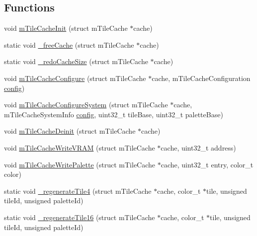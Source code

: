 \subsection*{Functions}
\begin{DoxyCompactItemize}
\item 
void \mbox{\hyperlink{tile-cache_8c_ae11c387e6cfd9f19218653824ee13308}{m\+Tile\+Cache\+Init}} (struct m\+Tile\+Cache $\ast$cache)
\item 
static void \mbox{\hyperlink{tile-cache_8c_a4f35746d84b7aef07507094ca898748f}{\+\_\+free\+Cache}} (struct m\+Tile\+Cache $\ast$cache)
\item 
static void \mbox{\hyperlink{tile-cache_8c_a153de28ed2867a57b6de1dff09c616b2}{\+\_\+redo\+Cache\+Size}} (struct m\+Tile\+Cache $\ast$cache)
\item 
void \mbox{\hyperlink{tile-cache_8c_aac84a3d9543f7c4b29734b064d88bc53}{m\+Tile\+Cache\+Configure}} (struct m\+Tile\+Cache $\ast$cache, m\+Tile\+Cache\+Configuration \mbox{\hyperlink{deflate_8c_a4473b5227787415097004fd39f55185e}{config}})
\item 
void \mbox{\hyperlink{tile-cache_8c_a17c8e2e1e7c0b387bcf886e51b3c1fa1}{m\+Tile\+Cache\+Configure\+System}} (struct m\+Tile\+Cache $\ast$cache, m\+Tile\+Cache\+System\+Info \mbox{\hyperlink{deflate_8c_a4473b5227787415097004fd39f55185e}{config}}, uint32\+\_\+t tile\+Base, uint32\+\_\+t palette\+Base)
\item 
void \mbox{\hyperlink{tile-cache_8c_a1426fbd1e5ca5db4617a2fc1745e2590}{m\+Tile\+Cache\+Deinit}} (struct m\+Tile\+Cache $\ast$cache)
\item 
void \mbox{\hyperlink{tile-cache_8c_a8234621c3fb1acb87f216401cce3f173}{m\+Tile\+Cache\+Write\+V\+R\+AM}} (struct m\+Tile\+Cache $\ast$cache, uint32\+\_\+t address)
\item 
void \mbox{\hyperlink{tile-cache_8c_a49ed123bd2aa01fafd4affa947ed5a62}{m\+Tile\+Cache\+Write\+Palette}} (struct m\+Tile\+Cache $\ast$cache, uint32\+\_\+t entry, color\+\_\+t color)
\item 
static void \mbox{\hyperlink{tile-cache_8c_a2ce7618147b6635261531801824ce86c}{\+\_\+regenerate\+Tile4}} (struct m\+Tile\+Cache $\ast$cache, color\+\_\+t $\ast$tile, unsigned tile\+Id, unsigned palette\+Id)
\item 
static void \mbox{\hyperlink{tile-cache_8c_ac73c7b43d4ecb49d64c6e6f47d5295a6}{\+\_\+regenerate\+Tile16}} (struct m\+Tile\+Cache $\ast$cache, color\+\_\+t $\ast$tile, unsigned tile\+Id, unsigned palette\+Id)
\item 

\end{DoxyCompactItemize}
